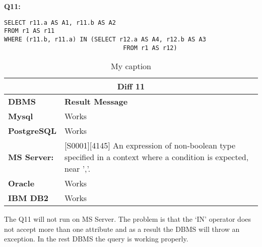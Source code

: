\begin{mdframed}[backgroundcolor=gray!20] 
\textbf{Q11:}
\begin{lstlisting}
SELECT r11.a AS A1, r11.b AS A2
FROM r1 AS r11
WHERE (r11.b, r11.a) IN (SELECT r12.a AS A4, r12.b AS A3
                         		 FROM r1 AS r12)  
\end{lstlisting}
\end{mdframed}



\begin{table}[]
\centering
\caption{My caption}
\label{my-label}
\begin{tabular}{|p{2cm}|p{12cm}|}
\hline
\multicolumn{2}{|c|}{\textbf{Diff 11}}                                                                                                                                                      \\ \hline
\textbf{DBMS}                              & \textbf{Result Message}                                                                                                                        \\ \hline
{\color[HTML]{333333} \textbf{Mysql}}      & {\color[HTML]{333333} Works}                                                                                                                   \\ \hline
{\color[HTML]{333333} \textbf{PostgreSQL}} & {\color[HTML]{333333} Works}                                                                                                                   \\ \hline
{\color[HTML]{333333} \textbf{MS Server:}} & {\color[HTML]{333333} {[}S0001{]}{[}4145{]} An expression of non-boolean type specified in a context where a condition is expected, near ','.} \\ \hline
\textbf{Oracle}                            & Works                                                                                                                                          \\ \hline
\textbf{IBM DB2}                           & Works                                                                                                                                          \\ \hline
\end{tabular}
\end{table}

The Q11 will not run on MS Server. The problem is that the ‘IN’ operator does not accept more than one attribute and as a result the DBMS will throw an exception. In the rest DBMS the query is working properly. 

